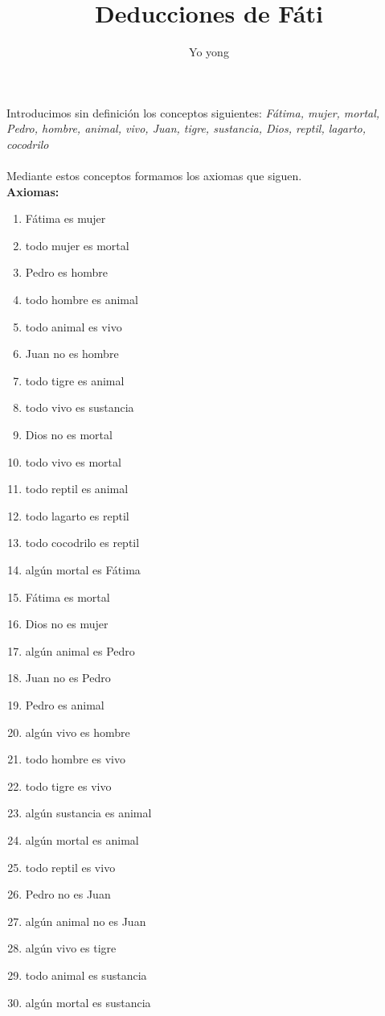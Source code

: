 ﻿\documentclass[12pt]{book}
\title{Deducciones de Fáti}
\author{Yo yong}
\date{}
\begin{document}
\maketitle
 Introducimos sin definición los conceptos siguientes: \textit{
Fátima, mujer, mortal, Pedro, hombre, animal, vivo, Juan, tigre, sustancia, Dios, reptil, lagarto, cocodrilo}
\\
\\Mediante estos conceptos formamos los axiomas que siguen. \\
\textbf{Axiomas:}
\begin{enumerate}
\item Fátima es mujer
\item todo mujer es mortal
\item Pedro es hombre
\item todo hombre es animal
\item todo animal es vivo
\item Juan no es hombre
\item todo tigre es animal
\item todo vivo es sustancia
\item Dios no es mortal
\item todo vivo es mortal
\item todo reptil es animal
\item todo lagarto es reptil
\item todo cocodrilo es reptil
\item algún mortal es Fátima
\item Fátima es mortal
\item Dios no es mujer
\item algún animal es Pedro
\item Juan no es Pedro
\item Pedro es animal
\item algún vivo es hombre
\item todo hombre es vivo
\item todo tigre es vivo
\item algún sustancia es animal
\item algún mortal es animal
\item todo reptil es vivo
\item Pedro no es Juan
\item algún animal no es Juan
\item algún vivo es tigre
\item todo animal es sustancia
\item algún mortal es sustancia

\end{enumerate}
\end{document}
